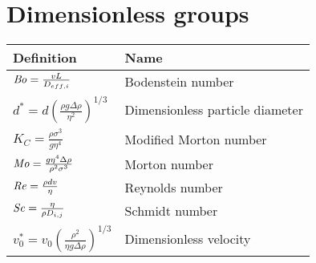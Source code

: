 \section*{Dimensionless groups}
{\renewcommand{\arraystretch}{2}
\begin{longtabu} to \textwidth {X[2]X[3]}
	\toprule
	\textbf{Definition} 									& \textbf{Name}\\ 
	\midrule		\endhead
	\bottomrule 	\endfoot
	$\operatorname{\mathit{B\kern-.10em o}} = \frac{v L}{D_{eff,i}}$							& Bodenstein number \\
	$d^{*} =  d \left(\frac{\rho g \Delta \rho}{\eta^2}\right)^{1/3}$	& Dimensionless particle diameter \\
	$K_{C} = \frac{\rho \sigma^3}{g \eta^4}$				& Modified Morton number \\
	$\operatorname{\mathit{M\kern-.10em o}} = \frac{g \eta^4 \Delta \rho}{\rho^2 \sigma^3}$ 	& Morton number\\
	$\operatorname{\mathit{R\kern-.04em e}} = \frac{\rho d v}{\eta}$ 						& Reynolds number \\
	$\operatorname{\mathit{S\kern-.07em c}} = \frac{\eta}{\rho D_{i,j}}$						& Schmidt number \\
	$v_{0}^{*} = v_0 \left(\frac{\rho^2}{\eta g \Delta \rho}\right)^{1/3}$ 	& Dimensionless velocity\\
\end{longtabu}}